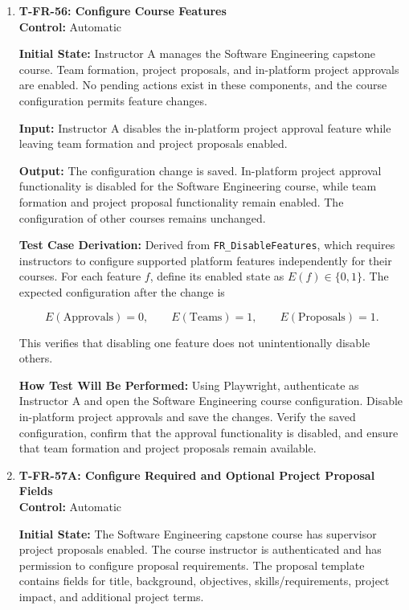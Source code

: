 \documentclass[12pt, titlepage]{article}
\begin{document}
\begin{enumerate}

\item \label{T-FR-56}\textbf{T-FR-56: Configure Course Features}\\

\textbf{Control:} Automatic

\textbf{Initial State:} Instructor A manages the Software Engineering capstone course. Team formation, project proposals, and in-platform project approvals are enabled. No pending actions exist in these components, and the course configuration permits feature changes.

\textbf{Input:} Instructor A disables the in-platform project approval feature while leaving team formation and project proposals enabled.

\textbf{Output:} The configuration change is saved. In-platform project approval functionality is disabled for the Software Engineering course, while team formation and project proposal functionality remain enabled. The configuration of other courses remains unchanged.

\textbf{Test Case Derivation:} Derived from \texttt{FR\_DisableFeatures}, which requires instructors to configure supported platform features independently for their courses. For each feature $f$, define its enabled state as $E(f)\in\{0,1\}$. The expected configuration after the change is

\[
E(\mathrm{Approvals})=0,
\qquad
E(\mathrm{Teams})=1,
\qquad
E(\mathrm{Proposals})=1.
\]

This verifies that disabling one feature does not unintentionally disable others.

\textbf{How Test Will Be Performed:} Using Playwright, authenticate as Instructor A and open the Software Engineering course configuration. Disable in-platform project approvals and save the changes. Verify the saved configuration, confirm that the approval functionality is disabled, and ensure that team formation and project proposals remain available.

\item \label{T-FR-57A}\textbf{T-FR-57A: Configure Required and Optional Project Proposal Fields}\\

\textbf{Control:} Automatic

\textbf{Initial State:} The Software Engineering capstone course has supervisor project proposals enabled. The course instructor is authenticated and has permission to configure proposal requirements. The proposal template contains fields for title, background, objectives, skills/requirements, project impact, and additional project terms.


\end{enumerate}
\end{document}
